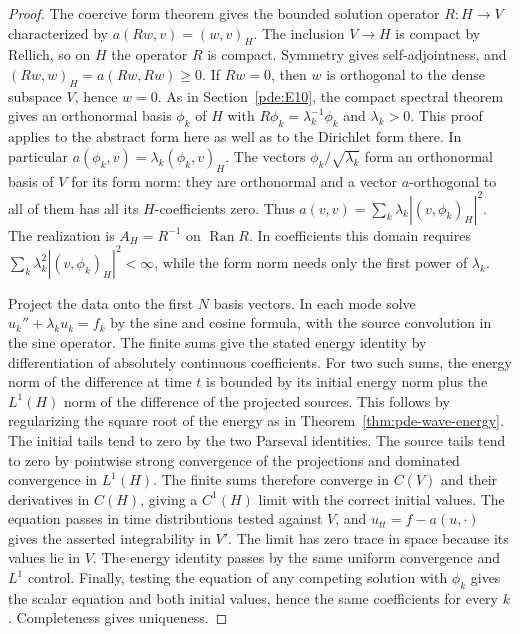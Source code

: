 \documentclass[11pt,oneside,openany]{book}
\theoremstyle{plain}
\theoremstyle{definition}
\theoremstyle{remark}
\begin{document}
\begin{proof}
The coercive form theorem gives the bounded solution operator
\(R:H\to V\) characterized by \(a(Rw,v)=(w,v)_H\).
The inclusion \(V\to H\) is compact by Rellich, so on \(H\) the
operator \(R\) is compact. Symmetry gives self-adjointness, and
\((Rw,w)_H=a(Rw,Rw)\geq0\). If \(Rw=0\), then \(w\) is orthogonal
to the dense subspace \(V\), hence \(w=0\). As in
Section~\ref{pde:E10}, the compact spectral theorem gives an
orthonormal basis \(\phi_k\) of \(H\) with \(R\phi_k=\lambda_k^{-1}\phi_k\)
and \(\lambda_k>0\). This proof applies to the abstract form here
as well as to the Dirichlet form there. In particular
\(a(\phi_k,v)=\lambda_k(\phi_k,v)_H\).
The vectors \(\phi_k/\sqrt{\lambda_k}\) form an orthonormal
basis of \(V\) for its form norm: they are orthonormal and a vector
\(a\)-orthogonal to all of them has all its \(H\)-coefficients
zero. Thus \(a(v,v)=\sum_k\lambda_k|(v,\phi_k)_H|^2\).
The realization is \(A_H=R^{-1}\) on \(\operatorname{Ran}R\).
In coefficients this domain requires
\(\sum_k\lambda_k^2|(v,\phi_k)_H|^2<\infty\), while the form
norm needs only the first power of \(\lambda_k\).

Project the data onto the first \(N\) basis vectors. In each mode
solve \(u_k''+\lambda_k u_k=f_k\) by the sine and cosine
formula, with the source convolution in the sine operator.
The finite sums give the stated energy identity by differentiation
of absolutely continuous coefficients. For two such sums, the
energy norm of the difference at time \(t\) is bounded by its
initial energy norm plus the \(L^1(H)\) norm of the difference of
the projected sources. This follows by regularizing the square
root of the energy as in Theorem~\ref{thm:pde-wave-energy}.
The initial tails tend to zero by the two Parseval identities.
The source tails tend to zero by pointwise strong convergence of
the projections and dominated convergence in \(L^1(H)\). The
finite sums therefore converge in \(C(V)\) and their derivatives
in \(C(H)\), giving a \(C^1(H)\) limit with the correct initial
values. The equation passes in time distributions tested against
\(V\), and \(u_{tt}=f-a(u,\cdot)\) gives the asserted integrability
in \(V'\). The limit has zero trace in space because its values
lie in \(V\). The energy identity passes by the same uniform
convergence and \(L^1\) control. Finally, testing the equation
of any competing solution with \(\phi_k\) gives the scalar
equation and both initial values, hence the same coefficients
for every \(k\). Completeness gives uniqueness.
\end{proof}
\end{document}
